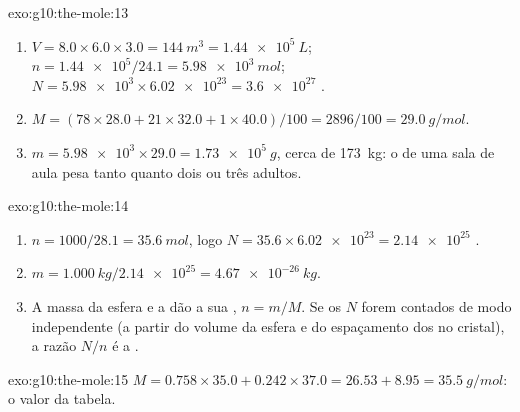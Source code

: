 \begin{solution}{exo:g10:the-mole:13}
\begin{enumerate}
  \item $V = 8.0 \times 6.0 \times 3.0 = \qty{144}{m^3} =
        \qty{1.44e5}{L}$; $n = \num{1.44e5} / 24.1 = \qty{5.98e3}{mol}$;
        $N = \num{5.98e3} \times \num{6.02e23} = \num{3.6e27}$ .
  \item $M = (78 \times 28.0 + 21 \times 32.0 + 1 \times 40.0) / 100 =
        2896 / 100 = \qty{29.0}{g/mol}$.
  \item $m = \num{5.98e3} \times 29.0 = \qty{1.73e5}{g}$, cerca de
        \qty{173}{kg}: o  de uma sala de aula pesa tanto quanto dois
        ou três adultos.
\end{enumerate}
\end{solution}

\begin{solution}{exo:g10:the-mole:14}
\begin{enumerate}
  \item $n = 1000 / 28.1 = \qty{35.6}{mol}$, logo
        $N = 35.6 \times \num{6.02e23} = \num{2.14e25}$ .
  \item $m = \qty{1.000}{kg} / \num{2.14e25} = \qty{4.67e-26}{kg}$.
  \item A massa da esfera e a  dão a sua , $n = m / M$. Se os  $N$ forem contados de modo
        independente (a partir do volume da esfera e do espaçamento dos
         no cristal), a razão $N / n$ é a .
\end{enumerate}
\end{solution}

\begin{solution}{exo:g10:the-mole:15}
$M = 0.758 \times 35.0 + 0.242 \times 37.0 = 26.53 + 8.95 =
\qty{35.5}{g/mol}$: o valor da tabela.
\end{solution}

